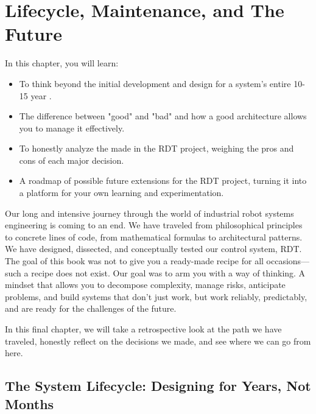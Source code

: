
\chapter{Lifecycle, Maintenance, and The Future}
\label{chap:lifecycle_and_future}


\begin{navigationbox}{In this chapter, you will learn:}
    \begin{itemize}
        \item To think beyond the initial development and design for a system's entire 10-15 year .
        \item The difference between "good" and "bad"  and how a good architecture allows you to manage it effectively.
        \item To honestly analyze the  made in the RDT project, weighing the pros and cons of each major decision.
        \item A roadmap of possible future extensions for the RDT project, turning it into a platform for your own learning and experimentation.
    \end{itemize}
\end{navigationbox}

Our long and intensive journey through the world of industrial robot systems engineering is coming to an end. We have traveled from philosophical principles to concrete lines of code, from mathematical formulas to architectural patterns. We have designed, dissected, and conceptually tested our control system, RDT. The goal of this book was not to give you a ready-made recipe for all occasions—such a recipe does not exist. Our goal was to arm you with a way of thinking. A mindset that allows you to decompose complexity, manage risks, anticipate problems, and build systems that don't just work, but work reliably, predictably, and are ready for the challenges of the future.

In this final chapter, we will take a retrospective look at the path we have traveled, honestly reflect on the decisions we made, and see where we can go from here.

\section{The System Lifecycle: Designing for Years, Not Months}
\label{sec:system_lifecycle}

